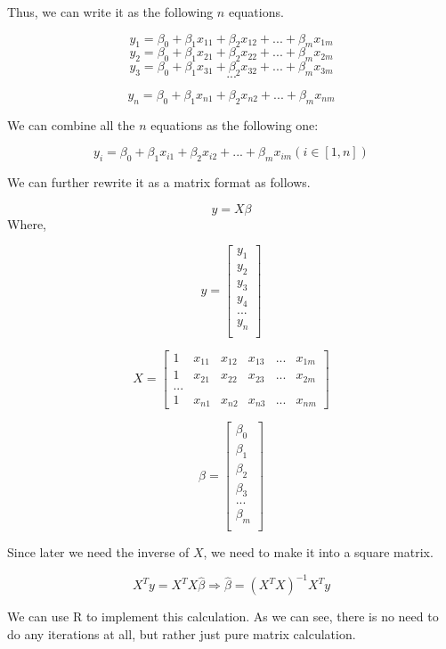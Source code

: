 \documentclass[]{book}
\begin{document}
Thus, we can write it as the following \(n\) equations.

\[y_1=\beta_0+\beta_1 x_{11}+\beta_2 x_{12}+...+ \beta_m x_{1m}\]
\[y_2=\beta_0+\beta_1 x_{21}+\beta_2 x_{22}+...+ \beta_m x_{2m}\]
\[y_3=\beta_0+\beta_1 x_{31}+\beta_2 x_{32}+...+ \beta_m x_{3m}\]
\[...\]

\[y_n=\beta_0+\beta_1 x_{n1}+\beta_2 x_{n2}+...+ \beta_m x_{nm}\]

We can combine all the \(n\) equations as the following one:

\[y_i=\beta_0+\beta_1 x_{i1}+\beta_2 x_{i2}+...+ \beta_m x_{im}  (i \in [1,n])\]

We can further rewrite it as a matrix format as follows.

\[y= X \beta\]
Where,

\[y = \begin{bmatrix}y_1 \\
y_2 \\
y_3 \\
y_4 \\
...\\
y_n \\
\end{bmatrix}\]

\[X=\begin{bmatrix}
1 & x_{11} & x_{12} & x_{13} & ... & x_{1m}\\
1 & x_{21} & x_{22} & x_{23} & ... & x_{2m} \\
...\\
1 & x_{n1} & x_{n2} & x_{n3} & ... & x_{nm}
\end{bmatrix}\]

\[\beta = \begin{bmatrix}\beta_0 \\
\beta_1 \\
\beta_2 \\
\beta_3 \\
...\\
\beta_m \\
\end{bmatrix}\]

Since later we need the inverse of \(X\), we need to make it into a square matrix.

\[X^Ty=X^TX \hat{\beta} \Rightarrow \hat{\beta} = (X^TX)^{-1} X^Ty\]

We can use R to implement this calculation. As we can see, there is no need to do any iterations at all, but rather just pure matrix calculation.
\end{document}
